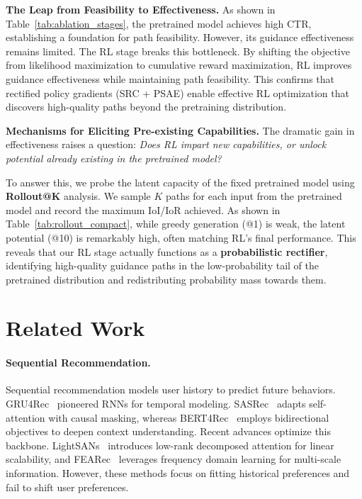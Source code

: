 \documentclass{llmxive}
\begin{document}
\textbf{The Leap from Feasibility to Effectiveness.} 
As shown in Table~\ref{tab:ablation_stages}, the pretrained model achieves high CTR, establishing a foundation for path feasibility. However, its guidance effectiveness remains limited. The RL stage breaks this bottleneck. By shifting the objective from likelihood maximization to cumulative reward maximization, RL improves guidance effectiveness while maintaining path feasibility. This confirms that rectified policy gradients (SRC + PSAE) enable effective RL optimization that discovers high-quality paths beyond the pretraining distribution.

\textbf{Mechanisms for Eliciting Pre-existing Capabilities.} 
The dramatic gain in effectiveness raises a question: \textit{Does RL impart new capabilities, or unlock potential already existing in the pretrained model?}

To answer this, we probe the latent capacity of the fixed pretrained model using \textbf{Rollout@K} analysis. We sample $K$ paths for each input from the pretrained model and record the maximum IoI/IoR achieved. As shown in Table~\ref{tab:rollout_compact}, while greedy generation (@1) is weak, the latent potential (@10) is remarkably high, often matching RL's final performance. This reveals that our RL stage actually functions as a \textbf{probabilistic rectifier}, identifying high-quality guidance paths in the low-probability tail of the pretrained distribution and redistributing probability mass towards them.
\section{Related Work}
\paragraph{Sequential Recommendation.}
Sequential recommendation models user history to predict future behaviors. GRU4Rec~\cite{hidasi2015session} pioneered RNNs for temporal modeling. SASRec~\cite{kang2018self} adapts self-attention with causal masking, whereas BERT4Rec~\cite{sun2019bert4rec} employs bidirectional objectives to deepen context understanding. Recent advances optimize this backbone. LightSANs~\cite{fan2021lighter} introduces low-rank decomposed attention for linear scalability, and FEARec~\cite{du2023frequency} leverages frequency domain learning for multi-scale information. However, these methods focus on fitting historical preferences and fail to shift user preferences.
\end{document}
